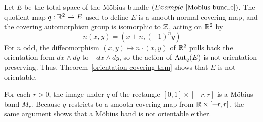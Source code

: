 \begin{example}
Let $E$ be the total space of the M\"obius bundle $(Example~\ref{Mobius bundle})$. The quotient map $q:\mathbb{R}^2\to E$ used to define $E$ is a smooth normal covering map, and the covering automorphism group is isomorphic to $\mathbb{Z}$, acting on $\mathbb{R}^2$ by 
\[n(x,y)=(x+n,(-1)^ny)\] 
For $n$ odd, the diffeomorphism $(x,y)\mapsto n\cdot (x,y)$ of $\mathbb{R}^2$ pulls back the orientation form $dx\wedge dy$ to $-dx\wedge dy$, so the action of $\mathrm{Aut}_q(E)$ is not orientation-preserving. Thus, Theorem~\ref{orientation covering thm} shows that $E$ is not orientable.\par
For each $r>0$, the image under $q$ of the rectangle $[0,1]\times[-r,r]$ is a M\"obius
band $M_r$. Because $q$ restricts to a smooth covering map from $\mathbb{R}\times[-r,r]$, the
same argument shows that a M\"obius band is not orientable either.
\end{example}
